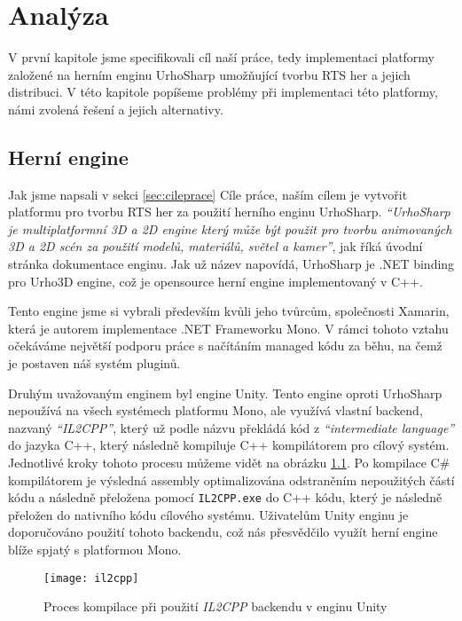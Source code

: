 \chapter{Analýza}
V první kapitole jsme specifikovali cíl naší práce, tedy implementaci platformy založené na herním enginu UrhoSharp umožňující tvorbu RTS her a jejich distribuci. V této kapitole popíšeme problémy při implementaci této platformy, námi zvolená řešení a jejich alternativy.

\section{Herní engine}
Jak jsme napsali v sekci \ref{sec:cileprace} Cíle práce, naším cílem je vytvořit platformu pro tvorbu RTS her za použití herního enginu UrhoSharp. \textit{``UrhoSharp je multiplatformní 3D a 2D engine který může být použit pro tvorbu animovaných 3D a 2D scén za použití modelů, materiálů, světel a kamer''}\citep{site:urhosharp}, jak říká úvodní stránka dokumentace enginu. Jak už název napovídá, UrhoSharp je .NET binding pro Urho3D engine\citep{site:urho3D}, což je opensource herní engine implementovaný v C++.

Tento engine jsme si vybrali především kvůli jeho tvůrcům, společnosti Xamarin, která je autorem implementace .NET Frameworku Mono. V rámci tohoto vztahu očekáváme největší podporu práce s načítáním managed kódu za běhu, na čemž je postaven náš systém pluginů. 

Druhým uvažovaným enginem byl engine Unity. Tento engine oproti UrhoSharp nepoužívá na všech systémech platformu Mono, ale využívá vlastní backend, nazvaný \textit{``IL2CPP''}\citep{site:il2cpp}, který už podle názvu překládá kód z \textit{``intermediate language''} do jazyka C++, který následně kompiluje C++ kompilátorem pro cílový systém. Jednotlivé kroky tohoto procesu můžeme vidět na obrázku \ref{fig:il2cpp}. Po kompilace C\# kompilátorem je výsledná assembly optimalizována odstraněním nepoužitých částí kódu a následně přeložena pomocí \texttt{IL2CPP.exe} do C++ kódu, který je následně přeložen do nativního kódu cílového systému. Uživatelům Unity enginu je doporučováno použití tohoto backendu, což nás přesvědčilo využít herní engine blíže spjatý s platformou Mono.

\begin{figure}[h]
	\centering
	\texttt{[image: il2cpp]}
	\caption{Proces kompilace při použití \textit{IL2CPP} backendu v enginu Unity}
	\label{fig:il2cpp}
\end{figure}

